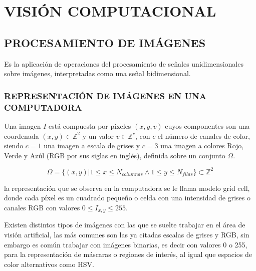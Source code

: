 \section{VISIÓN COMPUTACIONAL}
    
    \subsection{PROCESAMIENTO DE IMÁGENES}
        Es la aplicación de operaciones del procesamiento de señales unidimensionales sobre imágenes, interpretadas como una señal bidimensional.
        
        \subsubsection{REPRESENTACIÓN DE IMÁGENES EN UNA COMPUTADORA}
        Una imagen $I$ está compuesta por píxeles $(x, y, v)$ cuyos componentes son una coordenada $(x, y) \in \mathbb{Z}^2$ y un valor $v \in \mathbb{Z}^c$, con $c$ el número de canales de color, siendo $c=1$ una imagen a escala de grises y $c=3$ una imagen a colores Rojo, Verde y Azúl (RGB por sus siglas en inglés), definida sobre un conjunto $\Omega$. 
        
        \begin{equation}
            \Omega = \{(x, y)| 1 \leq x \leq N_{columnas} \land 1 \leq y \leq N_{filas}\} \subset \mathbb{Z}^2
        \end{equation}
        
        la representación que se observa en la computadora se le llama modelo grid cell, donde cada píxel es un cuadrado pequeño o celda con una intensidad de grises o canales RGB \citep{10.5555/2584519} con valores $0 \leq I_{x, y} \leq 255$.
        
        Existen distintos tipos de imágenes con las que se suelte trabajar en el área de visión artificial, las más comunes son las ya citadas escalas de grises y RGB, sin embargo es común trabajar con imágenes binarias, es decir con valores 0 o 255, para la representación de máscaras o regiones de interés, al igual que espacios de color alternativos como HSV.

